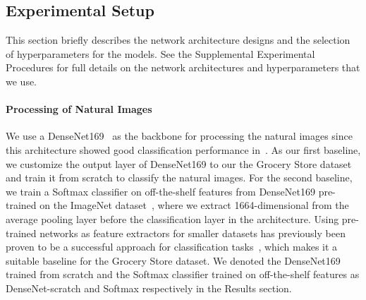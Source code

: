 \subsection{Experimental Setup}
\label{paperB:sec:experimental_setup}

This section briefly describes the network architecture designs and the selection of hyperparameters for the models. See the Supplemental Experimental Procedures
for full details on the network architectures and hyperparameters that we use.

\paragraph{Processing of Natural Images} We use a DenseNet169~ as the backbone for processing the natural images since this architecture showed good classification performance in~. As our first baseline, we customize the output layer of DenseNet169 to our the Grocery Store dataset and train it from scratch to classify the natural images. For the second baseline, we train a Softmax classifier on off-the-shelf features from DenseNet169 pre-trained on the ImageNet dataset~, where we extract 1664-dimensional from the average pooling layer before the classification layer in the architecture. Using pre-trained networks as feature extractors for smaller datasets has previously been proven to be a successful approach for classification tasks~, which makes it a suitable baseline for the Grocery Store dataset. We denoted the DenseNet169 trained from scratch and the Softmax classifier trained on off-the-shelf features as DenseNet-scratch and Softmax respectively in the Results section.%


